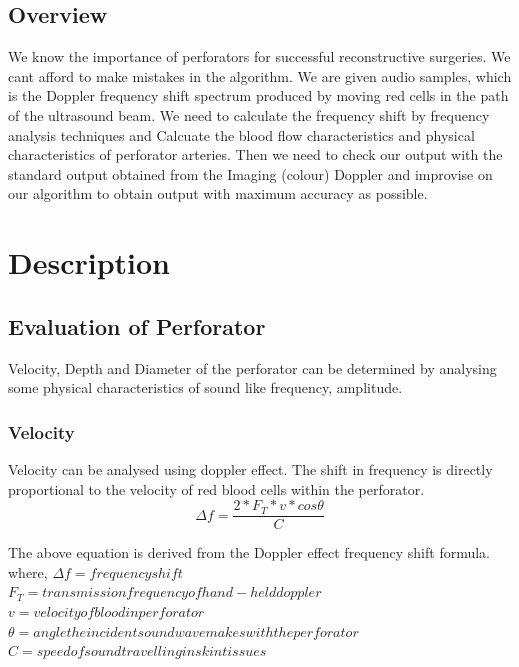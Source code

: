 \documentclass[BTech]{nitkdiss}
\begin{document}
\section{Overview}          
\hspace{0.4cm} We know the importance of perforators for successful reconstructive surgeries. We cant afford to make mistakes in the algorithm. We are given audio samples, which is the Doppler frequency shift spectrum produced by moving red cells in the path of the ultrasound beam. We need to calculate the frequency shift by frequency analysis techniques and Calcuate the blood flow characteristics and physical characteristics of perforator arteries. Then we need to check our output with the standard output obtained from the Imaging (colour) Doppler and improvise on our algorithm to obtain output with maximum accuracy as possible. 

\chapter{Description}
\section{Evaluation of Perforator}
\hspace{0.4cm} Velocity, Depth and Diameter of the perforator can be determined by analysing some physical characteristics of sound like frequency, amplitude. 
\subsection{Velocity}
\hspace{0.4cm} Velocity can be analysed using doppler effect. The shift in frequency is directly proportional to the velocity of red blood cells within the perforator. \\

 { \Huge \[ \Delta f = \frac{2 * F_T * v * cos \theta}{C} \] }
 
 The above equation is derived from the Doppler effect frequency shift formula. where, $\Delta f = frequency shift$\\ $F_T = transmission frequency of hand-held doppler$\\ $v = velocity of blood in perforator$\\ $\theta = angle the incident sound wave makes with the perforator$\\ $C = speed of sound travelling in skin tissues$\\
 
\end{document}
